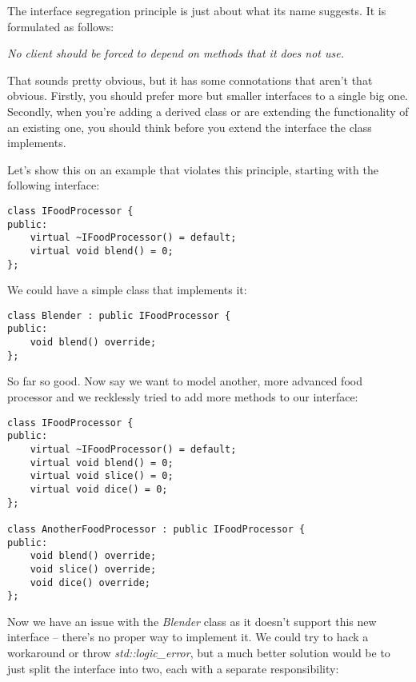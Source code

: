 The interface segregation principle is just about what its name suggests. It is formulated as follows:

\noindent
\hspace*{0.8cm}\textit{No client should be forced to depend on methods that it does not use.}

That sounds pretty obvious, but it has some connotations that aren't that obvious. Firstly, you should prefer more but smaller interfaces to a single big one. Secondly, when you're adding a derived class or are extending the functionality of an existing one, you should think before you extend the interface the class implements.

Let's show this on an example that violates this principle, starting with the following interface:

\begin{lstlisting}[style=styleCXX]
class IFoodProcessor {
public:
	virtual ~IFoodProcessor() = default;
	virtual void blend() = 0;
};

\end{lstlisting}

We could have a simple class that implements it:

\begin{lstlisting}[style=styleCXX]
class Blender : public IFoodProcessor {
public:
	void blend() override;
};

\end{lstlisting}

So far so good. Now say we want to model another, more advanced food processor and we recklessly tried to add more methods to our interface:


\begin{lstlisting}[style=styleCXX]
class IFoodProcessor {
public:
	virtual ~IFoodProcessor() = default;
	virtual void blend() = 0;
	virtual void slice() = 0;
	virtual void dice() = 0;
};

class AnotherFoodProcessor : public IFoodProcessor {
public:
	void blend() override;
	void slice() override;
	void dice() override;
};

\end{lstlisting}

Now we have an issue with the \textit{Blender} class as it doesn't support this new interface – there's no proper way to implement it. We could try to hack a workaround or throw \textit{std::logic\_error}, but a much better solution would be to just split the interface into two, each with a separate responsibility:


